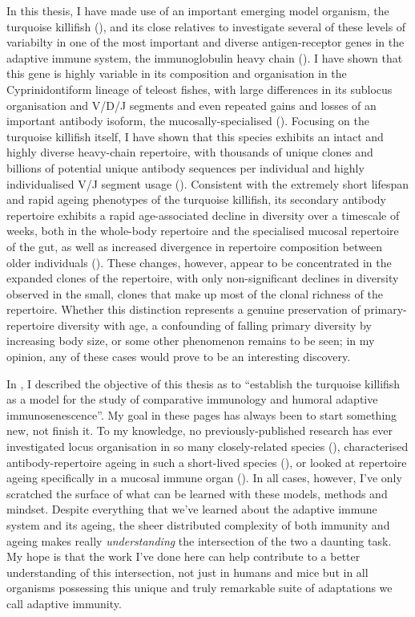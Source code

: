 In this thesis, I have made use of an important emerging model organism, the turquoise killifish (\nfu), and its close relatives to investigate several of these levels of variabilty in one of the most important and diverse antigen-receptor genes in the adaptive immune system, the immunoglobulin heavy chain (\igh{}). I have shown that this gene is highly variable in its composition and organisation in the Cyprinidontiform lineage of teleost fishes, with large differences in its sublocus organisation and V/D/J segments and even repeated gains and losses of an important antibody isoform, the mucosally-specialised  (). Focusing on the turquoise killifish itself, I have shown that this species exhibits an intact and highly diverse heavy-chain repertoire, with thousands of unique clones and billions of potential unique antibody sequences per individual and highly individualised V/J segment usage (). Consistent with the extremely short lifespan and rapid ageing phenotypes of the turquoise killifish, its secondary antibody repertoire exhibits a rapid age-associated decline in diversity over a timescale of weeks, both in the whole-body repertoire and the specialised mucosal repertoire of the gut, as well as increased divergence in repertoire composition between older individuals (). These changes, however, appear to be concentrated in the expanded clones of the repertoire, with only non-significant declines in diversity observed in the small, \naive clones that make up most of the clonal richness of the repertoire. Whether this distinction represents a genuine preservation of primary-repertoire diversity with age, a confounding of falling primary diversity by increasing body size, or some other phenomenon remains to be seen; in my opinion, any of these cases would prove to be an interesting discovery.

In , I described the objective of this thesis as to ``establish the turquoise killifish as a model for the study of comparative immunology and humoral adaptive immunosenescence''. My goal in these pages has always been to start something new, not finish it. To my knowledge, no previously-published research has ever investigated \igh{} locus organisation in so many closely-related species (), characterised antibody-repertoire ageing in such a short-lived species (), or looked at repertoire ageing specifically in a mucosal immune organ (). In all cases, however, I've only scratched the surface of what can be learned with these models, methods and mindset. Despite everything that we've learned about the adaptive immune system and its ageing, the sheer distributed complexity of both immunity and ageing makes really \textit{understanding} the intersection of the two a daunting task. My hope is that the work I've done here can help contribute to a better understanding of this intersection, not just in humans and mice but in all organisms possessing this unique and truly remarkable suite of adaptations we call adaptive immunity.